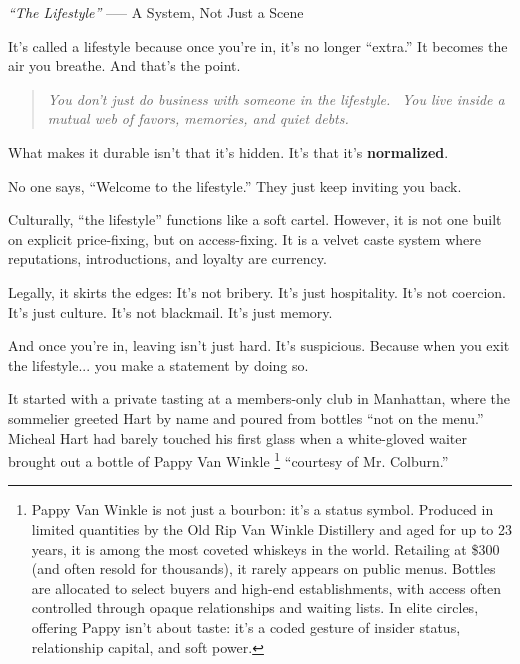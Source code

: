 \begin{HistoricalSidebar}{\textit{“The Lifestyle”} --— A System, Not Just a Scene}
  \medskip
  
  It’s called a lifestyle because once you’re in, it’s no longer “extra.” It becomes the air you breathe. And that’s 
  the point.
  
  \begin{quote}
    \textit{You don’t just do business with someone in the lifestyle.} \
    \textit{You live inside a mutual web of favors, memories, and quiet debts.}
  \end{quote}

  \medskip
  
  What makes it durable isn’t that it’s hidden.  It’s that it’s \textbf{normalized}.

  \medskip
  
  No one says, “Welcome to the lifestyle.” They just keep inviting you back.
  
  \medskip
  
  Culturally, “the lifestyle” functions like a soft cartel. However, it is not one built on explicit price-fixing, 
  but on access-fixing. It is a velvet caste system where reputations, introductions, and loyalty are currency.
  
  \medskip
  
  Legally, it skirts the edges:
  It's not bribery. It's just hospitality.
  It's not coercion. It's just culture.
  It's not blackmail. It's just memory.
  
  \medskip
  
  And once you’re in, leaving isn’t just hard. It’s suspicious.  Because when you exit the lifestyle...  
  you make a statement by doing so.
  
\end{HistoricalSidebar}

\medskip

It started with a private tasting at a members-only club in Manhattan, where the sommelier greeted Hart by name and poured 
from bottles ``not on the menu.'' Micheal Hart had barely touched his first glass when a white-gloved waiter brought out a 
bottle of Pappy Van Winkle
\footnote{Pappy Van Winkle is not just a bourbon: it's a status symbol. Produced in limited quantities by the Old Rip Van 
Winkle Distillery and aged for up to 23 years, it is among the most coveted whiskeys in the world. Retailing at \$300 
(and often resold for thousands), it rarely appears on public menus. Bottles are allocated to select buyers and high-end 
establishments, with access often controlled through opaque relationships and waiting lists. In elite circles, offering 
Pappy isn't about taste: it's a coded gesture of insider status, relationship capital, and soft power.}
 ``courtesy of Mr. Colburn.''


